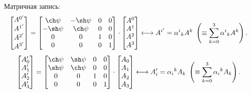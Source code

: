     Матричная запись:
    \[
        \begin{bmatrix} A^{0'} \\ A^{1'} \\ A^{2'} \\ A^{3'} \end{bmatrix}
        =
        \begin{bmatrix}
            \ch \psi & -\sh\psi & 0 & 0 \\
            -\sh\psi & \ch \psi & 0 & 0 \\
            0 & 0 & 1 & 0 \\
            0 & 0 & 0 & 1
        \end{bmatrix}
        \cdot
        \begin{bmatrix} A^0 \\ A^1 \\ A^2 \\ A^3 \end{bmatrix}
        \longleftrightarrow
        A^{i'} = {\alpha^i}_k A^k \ \brackets{\equiv \sum_{k=0}^3 {\alpha^i}_k A^k}.
    \]
    \[
        \begin{bmatrix} A_0'  \\ A_1' \\ A_2' \\ A_3' \end{bmatrix}
        =
        \begin{bmatrix}
            \ch\psi & \sh\psi & 0 & 0 \\
            \sh\psi & \ch\psi & 0 & 0 \\
            0 & 0 & 1 & 0 \\
            0 & 0 & 0 & 1
        \end{bmatrix}
        \cdot
        \begin{bmatrix} A_0 \\ A_1 \\ A_2 \\ A_3 \end{bmatrix}
        \longleftrightarrow
        A_i' = {\alpha_i}^k A_k \ \brackets{\equiv \sum_{k=0}^3 {\alpha_i}^k A_k}.
    \]

